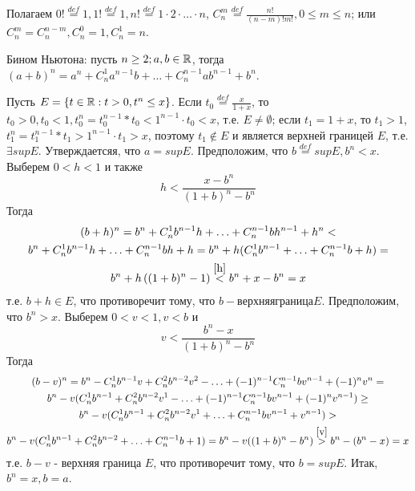 \documentclass[main]{subfiles}
\begin{document}
\begin{definition}
    Полагаем $0! \overset{def}{=} 1, 1! \overset{def}{=} 1, n! \overset{def}{=}
    1 \cdot 2 \cdot \ldots \cdot n$, $C_n^m \overset{def}{=} 
    \frac{n!}{(n - m)!m!}, 0 \leq m \leq n$; или $C_n^m = C_n^{n - m}, C_n^0 = 1,
    C_n^1 = n$. 
    
    Бином Ньютона: пусть $n \geq 2; a, b \in \mathbb{R}$, тогда $(a + b)^n = 
    a^n + C_n^1a^{n-1}b + \ldots + C_n^{n-1}ab^{n-1} + b^n$.
    
    Пусть $E = \{t \in \mathbb{R}: t > 0, t^n \leq x\}$. Если $t_0 \overset{def}{=} 
    \frac{x}{1 + x}$, то $t_0 > 0, t_0 < 1, t_0^n = t_0^{n-1} * t_0 < 1^{n-1}
    \cdot t_0 < x$, т.е. $E \neq \emptyset$; если $t_1 = 1 + x$, то $t_1 > 1$,
    $t_1^n = t_1^{n-1} * t_1 > 1^{n-1} \cdot t_1 > x$, поэтому $t_1 \notin E$
    и является верхней границей $E$, т.е. $\exists supE$. Утверждаетсяя, что 
    $a = supE$. Предположим, что $b \overset{def}{=} supE, b^n < x$. 
    Выберем $0 < h < 1$ и также
    \begin{equation} \label{h}
        h < \frac{x - b^n}{(1 + b)^n - b^n}
    \end{equation} 
    Тогда 
    \begin{multline*}
        (b + h)^n = b^n + C_n^1b^{n-1}h + \ldots + C_n^{n-1}bh^{n-1} + h^n < \\
        b^n + C_n^1b^{n-1}h + \ldots + C_n^{n-1}bh + h = 
        b^n + h(C_n^1b^{n-1} + \ldots + C_n^{n-1}b + h) = \\
        b^n + h\left((1 + b)^n - 1\right) \overset{\ref{h}}{<} 
        b^n + x - b^n = x
    \end{multline*}
    т.е. $b + h \in E$, что противоречит тому, что $b - верхняя граница E$.
    Предположим, что $b^n > x$. Выберем $0 < v < 1, v < b$ и 
    \begin{equation}\label{v}
        v < \frac{b^n - x}{(1 + b)^n - b^n}
    \end{equation}
    Тогда
    \begin{multline*}
        (b - v)^n = b^n - C_n^1b^{n-1}v + C_n^2b^{n-2}v^2 - \ldots + 
        (-1)^{n-1}C_n^{n-1}bv^{n-1} + (-1)^{n}v^n = \\ b^n - 
        v(C_n^1b^{n-1} + C_n^2b^{n-2}v^1 - \ldots + 
        (-1)^{n-1}C_n^{n-1}bv^{n-1} + (-1)^{n}v^{n-1}) \geq \\
        b^n - v(C_n^1b^{n-1} + C_n^2b^{n-2}v^1 + \ldots + 
        C_n^{n-1}bv^{n-1} + v^{n-1}) > \\
        b^n - v(C_n^1b^{n-1} + C_n^2b^{n-2} + \ldots + C_n^{n-1}b + 1) = 
        b^n - v((1 + b)^n - b^n) \overset{\ref{v}}{>} b^n - (b^n - x) = x
    \end{multline*}
    т.е. $b - v$ - верхняя граница $E$, что противоречит тому, что $b = supE$.
    Итак, $b^n = x, b = a$.
\end{definition}
\end{document}
